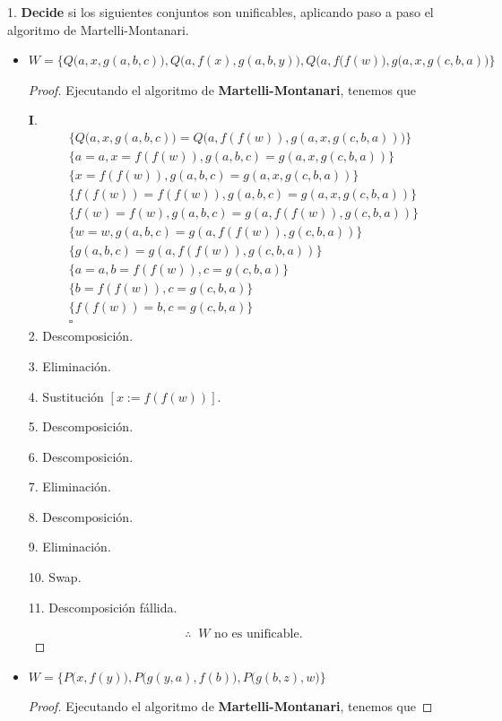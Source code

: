 \documentclass{article}
\begin{document}
\vspace*{0.5cm}
1. \textbf{Decide} si los siguientes conjuntos son unificables, aplicando paso a paso el algoritmo de
Martelli-Montanari.
\newcommand{\localtextbulletone}{\textcolor{black}{\raisebox{.45ex}{\rule{.6ex}{.6ex}}}}
\renewcommand{\labelitemi}{\localtextbulletone}
\begin{itemize}
\item $W = \{Q\big(a,x, g(a,b,c)\big), Q\big(a, f(x), g(a,b,y)), Q\big(a, f(f(w)\big), g(a, x, g(c, b, a)\big)\}$
  \begin{proof} Ejecutando el algoritmo de \textbf{Martelli-Montanari}, tenemos que
    
    \textbf{I}.
    \begin{eqnarray}
      & \{Q\big(a, x, g(a, b, c)\big) = Q\big(a, f(f(w)), g(a, x, g(c, b, a))\big)\} &\\
      & \{a = a, x = f(f(w)), g(a,b,c) = g(a, x, g(c, b, a))\} &\\
      & \{x = f(f(w)), g(a,b,c) = g(a, x, g(c, b, a))\} &\\
      & \{f(f(w)) = f(f(w)), g(a,b,c) = g(a, x, g(c, b, a))\} &\\
      & \{f(w) = f(w), g(a,b,c) = g(a, f(f(w)), g(c, b, a))\} &\\
      & \{w = w, g(a,b,c) = g(a, f(f(w)), g(c, b, a))\} &\\
      & \{g(a,b,c) = g(a, f(f(w)), g(c, b, a))\} &\\
      & \{a = a, b = f(f(w)), c = g(c, b, a)\} &\\
      & \{b = f(f(w)), c = g(c, b, a)\} &\\
      & \{f(f(w)) = b, c = g(c, b, a)\} &\\
      & \square &
    \end{eqnarray}
    2. Descomposición.

    3. Eliminación.

    4. Sustitución $[x := f(f(w))]$.

    5. Descomposición.

    6. Descomposición.

    7. Eliminación.

    8. Descomposición.

    9. Eliminación.
    
    10. Swap.
    
    11. Descomposición fállida.

    \[\therefore\;\; W \text{ no es unificable.}\]
  \end{proof}
  \newpage
\item $W = \{P\big(x, f(y)\big), P\big(g(y,a), f(b)\big), P\big(g(b,z), w\big)\}$
  \begin{proof} Ejecutando el algoritmo de \textbf{Martelli-Montanari}, tenemos que
    

\end{proof}
\end{itemize}
\end{document}
